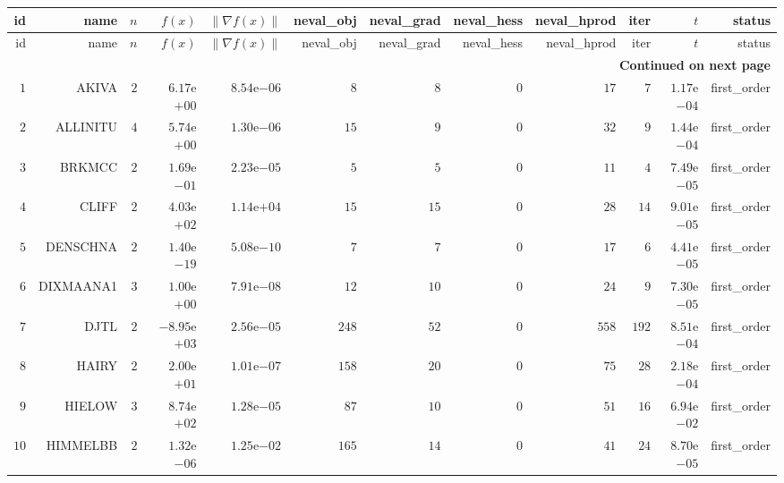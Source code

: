 \begin{longtable}{rrrrrrrrrrrr}
  \hline
  id & name & \(n\) & \(f(x)\) & \(\|\nabla f(x)\|\) & neval\_obj & neval\_grad & neval\_hess & neval\_hprod & iter & \(t\) & status \\\hline
  \endfirsthead
  \hline
  id & name & \(n\) & \(f(x)\) & \(\|\nabla f(x)\|\) & neval\_obj & neval\_grad & neval\_hess & neval\_hprod & iter & \(t\) & status \\\hline
  \endhead
  \hline
  \multicolumn{12}{r}{{\bfseries Continued on next page}}\\
  \hline
  \endfoot
  \endlastfoot
  \(     1\) & AKIVA & \(     2\) & \( 6.17\)e\(+00\) & \( 8.54\)e\(-06\) & \(     8\) & \(     8\) & \(     0\) & \(    17\) & \(     7\) & \( 1.17\)e\(-04\) & first\_order \\
  \(     2\) & ALLINITU & \(     4\) & \( 5.74\)e\(+00\) & \( 1.30\)e\(-06\) & \(    15\) & \(     9\) & \(     0\) & \(    32\) & \(     9\) & \( 1.44\)e\(-04\) & first\_order \\
  \(     3\) & BRKMCC & \(     2\) & \( 1.69\)e\(-01\) & \( 2.23\)e\(-05\) & \(     5\) & \(     5\) & \(     0\) & \(    11\) & \(     4\) & \( 7.49\)e\(-05\) & first\_order \\
  \(     4\) & CLIFF & \(     2\) & \( 4.03\)e\(+02\) & \( 1.14\)e\(+04\) & \(    15\) & \(    15\) & \(     0\) & \(    28\) & \(    14\) & \( 9.01\)e\(-05\) & first\_order \\
  \(     5\) & DENSCHNA & \(     2\) & \( 1.40\)e\(-19\) & \( 5.08\)e\(-10\) & \(     7\) & \(     7\) & \(     0\) & \(    17\) & \(     6\) & \( 4.41\)e\(-05\) & first\_order \\
  \(     6\) & DIXMAANA1 & \(     3\) & \( 1.00\)e\(+00\) & \( 7.91\)e\(-08\) & \(    12\) & \(    10\) & \(     0\) & \(    24\) & \(     9\) & \( 7.30\)e\(-05\) & first\_order \\
  \(     7\) & DJTL & \(     2\) & \(-8.95\)e\(+03\) & \( 2.56\)e\(-05\) & \(   248\) & \(    52\) & \(     0\) & \(   558\) & \(   192\) & \( 8.51\)e\(-04\) & first\_order \\
  \(     8\) & HAIRY & \(     2\) & \( 2.00\)e\(+01\) & \( 1.01\)e\(-07\) & \(   158\) & \(    20\) & \(     0\) & \(    75\) & \(    28\) & \( 2.18\)e\(-04\) & first\_order \\
  \(     9\) & HIELOW & \(     3\) & \( 8.74\)e\(+02\) & \( 1.28\)e\(-05\) & \(    87\) & \(    10\) & \(     0\) & \(    51\) & \(    16\) & \( 6.94\)e\(-02\) & first\_order \\
  \(    10\) & HIMMELBB & \(     2\) & \( 1.32\)e\(-06\) & \( 1.25\)e\(-02\) & \(   165\) & \(    14\) & \(     0\) & \(    41\) & \(    24\) & \( 8.70\)e\(-05\) & first\_order \\

\end{longtable}
